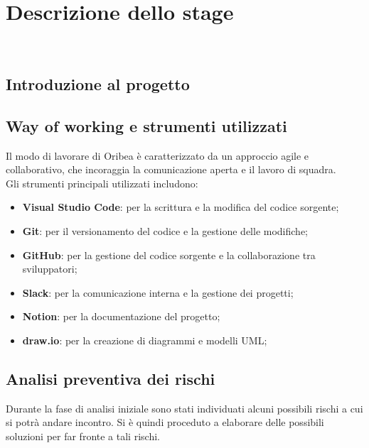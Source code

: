 \chapter{Descrizione dello stage}
\label{cap:descrizione-stage}

\\

\section{Introduzione al progetto}


\section{Way of working e strumenti utilizzati}
\label{sec:way-of-working}

Il modo di lavorare di Oribea è caratterizzato da un approccio agile e collaborativo, che incoraggia la comunicazione aperta e il lavoro di squadra.\\

Gli strumenti principali utilizzati includono:
\begin{itemize}
    \item \textbf{Visual Studio Code}: per la scrittura e la modifica del codice sorgente;
    \item \textbf{Git}: per il versionamento del codice e la gestione delle modifiche;
    \item \textbf{GitHub}: per la gestione del codice sorgente e la collaborazione tra sviluppatori;
    \item \textbf{Slack}: per la comunicazione interna e la gestione dei progetti;
    \item \textbf{Notion}: per la documentazione del progetto;
    \item \textbf{draw.io}: per la creazione di diagrammi e modelli UML; 
\end{itemize}

\section{Analisi preventiva dei rischi}

Durante la fase di analisi iniziale sono stati individuati alcuni possibili rischi a cui si potrà andare incontro.
Si è quindi proceduto a elaborare delle possibili soluzioni per far fronte a tali rischi.\\

